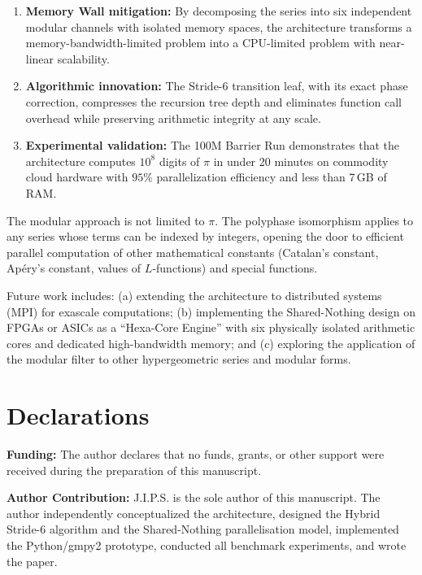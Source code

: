 \documentclass[12pt,a4paper]{article}
\theoremstyle{plain}
\theoremstyle{definition}
\theoremstyle{remark}
\begin{document}
\begin{enumerate}[label=(\roman*)]
    \item \textbf{Memory Wall mitigation:} By decomposing the series into six independent modular channels with isolated memory spaces, the architecture transforms a memory-bandwidth-limited problem into a CPU-limited problem with near-linear scalability.
    \item \textbf{Algorithmic innovation:} The Stride-6 transition leaf, with its exact phase correction, compresses the recursion tree depth and eliminates function call overhead while preserving arithmetic integrity at any scale.
    \item \textbf{Experimental validation:} The 100M Barrier Run demonstrates that the architecture computes \(10^8\) digits of \(\pi\) in under 20 minutes on commodity cloud hardware with \(95\%\) parallelization efficiency and less than 7\,GB of RAM.
\end{enumerate}

The modular approach is not limited to \(\pi\). The polyphase isomorphism applies to any series whose terms can be indexed by integers, opening the door to efficient parallel computation of other mathematical constants (Catalan's constant, Apéry's constant, values of \(L\)-functions) and special functions.

Future work includes: (a) extending the architecture to distributed systems (MPI) for exascale computations; (b) implementing the Shared-Nothing design on FPGAs or ASICs as a ``Hexa-Core Engine'' with six physically isolated arithmetic cores and dedicated high-bandwidth memory; and (c) exploring the application of the modular filter to other hypergeometric series and modular forms.

\section*{Declarations}

\textbf{Funding:} The author declares that no funds, grants, or other support were received during the preparation of this manuscript.

\vspace{0.5em}
\noindent\textbf{Author Contribution:} J.I.P.S. is the sole author of this manuscript. The author independently conceptualized the architecture, designed the Hybrid Stride-6 algorithm and the Shared-Nothing parallelisation model, implemented the Python/gmpy2 prototype, conducted all benchmark experiments, and wrote the paper.
\end{document}
